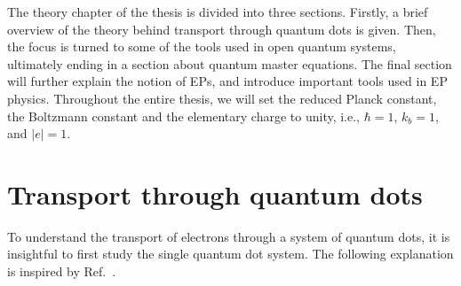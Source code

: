 \documentclass[../main.tex]{subfiles}
\begin{document}
The theory chapter of the thesis is divided into three sections. Firstly, a brief overview of the theory behind transport through quantum dots is given. Then, the focus is turned to some of the tools used in open quantum systems, ultimately ending in a section about quantum master equations. The final section will further explain the notion of EPs, and introduce important tools used in EP physics. Throughout the entire thesis, we will set the reduced Planck constant, the Boltzmann constant and the elementary charge to unity, i.e., $\hbar=1$, $k_b=1$, and $|e|=1$.

\section{Transport through quantum dots}
To understand the transport of electrons through a system of quantum dots, it is insightful to first study the single quantum dot system. The following explanation is inspired by Ref.~\cite{transport}.
\end{document}
